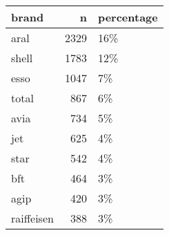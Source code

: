 \begin{table}[ht]
\centering
\begin{tabular}{lrl}
  \hline
brand & n & percentage \\ 
  \hline
aral & 2329 & 16\% \\ 
  shell & 1783 & 12\% \\ 
  esso & 1047 & 7\% \\ 
  total & 867 & 6\% \\ 
  avia & 734 & 5\% \\ 
  jet & 625 & 4\% \\ 
  star & 542 & 4\% \\ 
  bft & 464 & 3\% \\ 
  agip & 420 & 3\% \\ 
  raiffeisen & 388 & 3\% \\ 
   \hline
\end{tabular}
\end{table}
